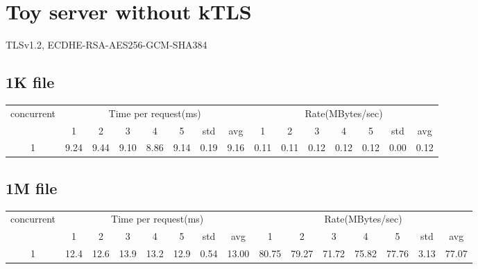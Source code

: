 \documentclass{article}
\begin{document}
\section*{Toy server without kTLS}
TLSv1.2, ECDHE-RSA-AES256-GCM-SHA384
\subsection*{1K file}
\begin{table}[H]
    \begin{tabular}{|c|c|c|c|c|c|c|c|c|c|c|c|c|c|c|}
        \hline
        \multirow{2}{*}{concurrent} & \multicolumn{7}{c|}{Time per request(ms)} & \multicolumn{7}{c|}{Rate(MBytes/sec)}                                                                                     \\ \cline{2-15}
                                    & 1                                         & 2                                     & 3    & 4    & 5    & std  & avg  & 1    & 2    & 3    & 4    & 5    & std  & avg  \\ \hline
        1                           & 9.24                                      & 9.44                                  & 9.10 & 8.86 & 9.14 & 0.19 & 9.16 & 0.11 & 0.11 & 0.12 & 0.12 & 0.12 & 0.00 & 0.12 \\ \hline
    \end{tabular}
\end{table}
\subsection*{1M file}
\begin{table}[H]
    \begin{tabular}{|c|c|c|c|c|c|c|c|c|c|c|c|c|c|c|}
        \hline
        \multirow{2}{*}{concurrent} & \multicolumn{7}{c|}{Time per request(ms)} & \multicolumn{7}{c|}{Rate(MBytes/sec)}                                                                                            \\ \cline{2-15}
                                    & 1                                         & 2                                     & 3    & 4    & 5    & std  & avg   & 1     & 2     & 3     & 4     & 5     & std  & avg   \\ \hline
        1                           & 12.4                                      & 12.6                                  & 13.9 & 13.2 & 12.9 & 0.54 & 13.00 & 80.75 & 79.27 & 71.72 & 75.82 & 77.76 & 3.13 & 77.07 \\ \hline
    \end{tabular}
\end{table}
\end{document}
